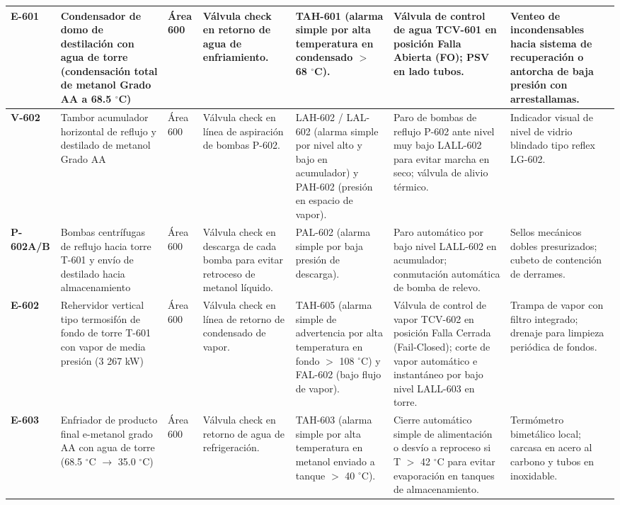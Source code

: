 \documentclass[10pt,letterpaper]{article}
\begin{document}
\begin{landscape}
\begin{xltabular}{\linewidth}{|l|p{2.8cm}|p{1.2cm}|>{\raggedright\arraybackslash}X|>{\raggedright\arraybackslash}X|>{\raggedright\arraybackslash}X|p{2.8cm}|}
\textbf{E-601} & Condensador de domo de destilación con agua de torre (condensación total de metanol Grado AA a 68.5 $^\circ$C) & Área 600 & Válvula check en retorno de agua de enfriamiento. & TAH-601 (alarma simple por alta temperatura en condensado $>$ 68 $^\circ$C). & Válvula de control de agua TCV-601 en posición Falla Abierta (FO); PSV en lado tubos. & Venteo de incondensables hacia sistema de recuperación o antorcha de baja presión con arrestallamas. \\ \hline
\textbf{V-602} & Tambor acumulador horizontal de reflujo y destilado de metanol Grado AA & Área 600 & Válvula check en línea de aspiración de bombas P-602. & LAH-602 / LAL-602 (alarma simple por nivel alto y bajo en acumulador) y PAH-602 (presión en espacio de vapor). & Paro de bombas de reflujo P-602 ante nivel muy bajo LALL-602 para evitar marcha en seco; válvula de alivio térmico. & Indicador visual de nivel de vidrio blindado tipo reflex LG-602. \\ \hline
\textbf{P-602A/B} & Bombas centrífugas de reflujo hacia torre T-601 y envío de destilado hacia almacenamiento & Área 600 & Válvula check en descarga de cada bomba para evitar retroceso de metanol líquido. & PAL-602 (alarma simple por baja presión de descarga). & Paro automático por bajo nivel LALL-602 en acumulador; conmutación automática de bomba de relevo. & Sellos mecánicos dobles presurizados; cubeto de contención de derrames. \\ \hline
\textbf{E-602} & Rehervidor vertical tipo termosifón de fondo de torre T-601 con vapor de media presión (3 267 kW) & Área 600 & Válvula check en línea de retorno de condensado de vapor. & TAH-605 (alarma simple de advertencia por alta temperatura en fondo $>$ 108 $^\circ$C) y FAL-602 (bajo flujo de vapor). & Válvula de control de vapor TCV-602 en posición Falla Cerrada (Fail-Closed); corte de vapor automático e instantáneo por bajo nivel LALL-603 en torre. & Trampa de vapor con filtro integrado; drenaje para limpieza periódica de fondos. \\ \hline
\textbf{E-603} & Enfriador de producto final e-metanol grado AA con agua de torre (68.5 $^\circ$C $\to$ 35.0 $^\circ$C) & Área 600 & Válvula check en retorno de agua de refrigeración. & TAH-603 (alarma simple por alta temperatura en metanol enviado a tanque $>$ 40 $^\circ$C). & Cierre automático simple de alimentación o desvío a reproceso si T $>$ 42 $^\circ$C para evitar evaporación en tanques de almacenamiento. & Termómetro bimetálico local; carcasa en acero al carbono y tubos en inoxidable. \\ \hline

\end{xltabular}
\end{landscape}
\end{document}
